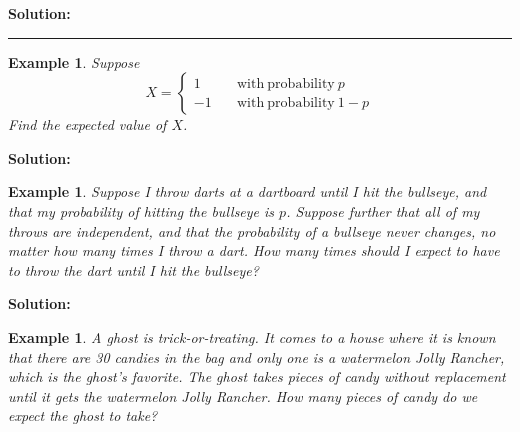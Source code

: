 \documentclass[12pt]{amsart}
\newtheorem{example}[theorem]{Example}
\begin{document}
{\textbf{Solution:}

\vspace{8cm}
\hrule
\vspace{.5cm}


\begin{example}
Suppose
$$
X = \left\{
        \begin{array}{ll}
            1 & \quad \mathrm{with\ probability}\ p \\
            -1 & \quad \mathrm{with\ probability}\ 1-p 
        \end{array}
    \right.
$$
Find the expected value of $X$.
\end{example}

\textbf{Solution:}



\newpage

\begin{example}\label{Bullseye}
Suppose I throw darts at a dartboard until I hit the bullseye, and that my probability of hitting the bullseye is $p$. Suppose further that all of my throws are independent, and that the probability of a bullseye never changes, no matter how many times I throw a dart. \newline
How many times should I expect to have to throw the dart until I hit the bullseye?

\end{example}

\textbf{Solution:}





\newpage

\begin{example}\label{GhostUniformTrickTreat}
A ghost is trick-or-treating. It comes to a house where it is known that there are 30 candies in the bag and only one is a watermelon Jolly Rancher, which is the ghost's favorite. The ghost takes pieces of candy without replacement until it gets the watermelon Jolly Rancher. \newline
How many pieces of candy do we expect the ghost to take?
\end{example}

}
\end{document}
